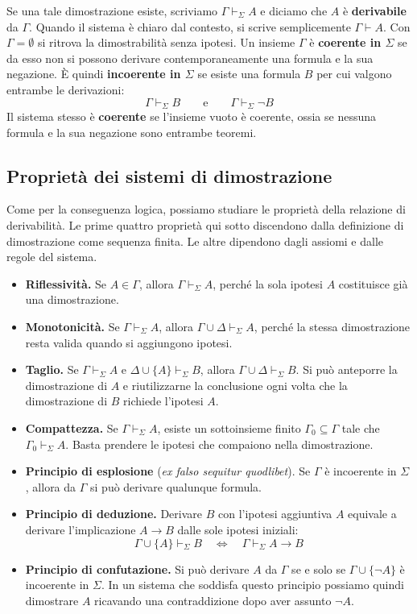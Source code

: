 \medskip
\noindent
Se una tale dimostrazione esiste, scriviamo $\Gamma\vdash_\Sigma A$ e
diciamo che $A$ è \textbf{derivabile} da $\Gamma$. Quando il sistema è
chiaro dal contesto, si scrive semplicemente $\Gamma\vdash A$.
Con $\Gamma=\emptyset$ si ritrova la dimostrabilità senza ipotesi.
Un insieme $\Gamma$ è \textbf{coerente in $\Sigma$} se da esso
non si possono derivare contemporaneamente una formula e la sua
negazione. È quindi \textbf{incoerente in $\Sigma$} se esiste una
formula $B$ per cui valgono entrambe le derivazioni:
\[
    \Gamma\vdash_\Sigma B
    \qquad\text{e}\qquad
    \Gamma\vdash_\Sigma\neg B
\]
Il sistema stesso è \textbf{coerente} se l'insieme vuoto è coerente,
ossia se nessuna formula e la sua negazione sono entrambe teoremi.

\subsection{Proprietà dei sistemi di dimostrazione}
Come per la conseguenza logica, possiamo studiare le proprietà
della relazione di derivabilità. Le prime quattro proprietà qui sotto
discendono dalla definizione di dimostrazione come sequenza finita.
Le altre dipendono dagli assiomi e dalle regole del sistema.
\begin{itemize}
    \item \textbf{Riflessività.} Se $A\in\Gamma$, allora
    $\Gamma\vdash_\Sigma A$, perché la sola ipotesi $A$ costituisce
    già una dimostrazione.
    \item \textbf{Monotonicità.} Se $\Gamma\vdash_\Sigma A$, allora
    $\Gamma\cup\Delta\vdash_\Sigma A$, perché la stessa dimostrazione
    resta valida quando si aggiungono ipotesi.
    \item \textbf{Taglio.} Se $\Gamma\vdash_\Sigma A$ e
    $\Delta\cup\{A\}\vdash_\Sigma B$, allora
    $\Gamma\cup\Delta\vdash_\Sigma B$. Si può anteporre la
    dimostrazione di $A$ e riutilizzarne la conclusione ogni volta
    che la dimostrazione di $B$ richiede l'ipotesi $A$.
    \item \textbf{Compattezza.} Se $\Gamma\vdash_\Sigma A$, esiste
    un sottoinsieme finito $\Gamma_0\subseteq\Gamma$ tale che
    $\Gamma_0\vdash_\Sigma A$. Basta prendere le ipotesi che
    compaiono nella dimostrazione.
    \item \textbf{Principio di esplosione} (\textit{ex falso
    sequitur quodlibet}). Se $\Gamma$ è incoerente in $\Sigma$,
    allora da $\Gamma$ si può derivare qualunque formula.
    \item \textbf{Principio di deduzione.} Derivare $B$ con
    l'ipotesi aggiuntiva $A$ equivale a derivare l'implicazione
    $A\to B$ dalle sole ipotesi iniziali:
    \[
        \Gamma\cup\{A\}\vdash_\Sigma B
        \quad\Longleftrightarrow\quad
        \Gamma\vdash_\Sigma A\to B
    \]
    \item \textbf{Principio di confutazione.} Si può derivare
    $A$ da $\Gamma$ se e solo se $\Gamma\cup\{\neg A\}$ è incoerente
    in $\Sigma$. In un sistema che soddisfa questo principio
    possiamo quindi dimostrare $A$ ricavando una contraddizione
    dopo aver assunto $\neg A$.
\end{itemize}


